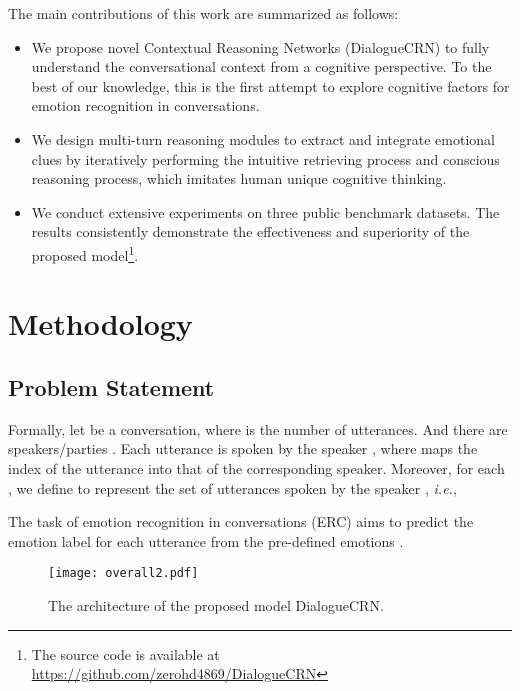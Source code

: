 \documentclass[11pt,a4paper]{article}
\begin{document}
The main contributions of this work are summarized as follows:
\begin{itemize}
  \item We propose novel Contextual Reasoning Networks (DialogueCRN) to fully understand the conversational context from a cognitive perspective. 
  To the best of our knowledge, this is the first attempt to explore cognitive factors for emotion recognition in conversations. 
  \item We design multi-turn reasoning modules to extract and integrate emotional clues by iteratively performing the intuitive retrieving process and conscious reasoning process, which imitates human unique cognitive thinking.
  \item We conduct extensive experiments on three public benchmark datasets. The results consistently demonstrate the effectiveness and superiority of the proposed model\footnote{ The source code is available at { \url{https://github.com/zerohd4869/DialogueCRN}}}. 


\end{itemize}

\section{Methodology}

\subsection{Problem Statement}
Formally, let  be a conversation, where  is the number of utterances.
And there are  speakers/parties .
Each utterance  is spoken by the speaker , where  maps the index of the utterance into that of the corresponding speaker.
Moreover, for each , we define  to represent the set of utterances spoken by the speaker , {\it i.e.}, 

The task of emotion recognition in conversations (ERC) aims to predict the emotion label  for each utterance  from the pre-defined emotions .

\begin{figure*}[t]
  \centering
  \texttt{[image: overall2.pdf]}
  \caption{The architecture of the proposed model DialogueCRN. }
  \label{fig:overall}
\end{figure*}
\end{document}
